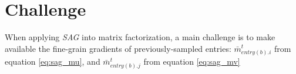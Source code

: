 \section{Challenge}
When applying \emph{SAG} into matrix factorization, a main challenge is to make available the fine-grain gradients of previously-sampled entries: 
$\bar{m}_{entry(b).i}^{t}$ from equation \ref{eq:sag_mu}, and 
$\bar{m}_{entry(b).j}^{t}$ from equation \ref{eq:sag_mv}

